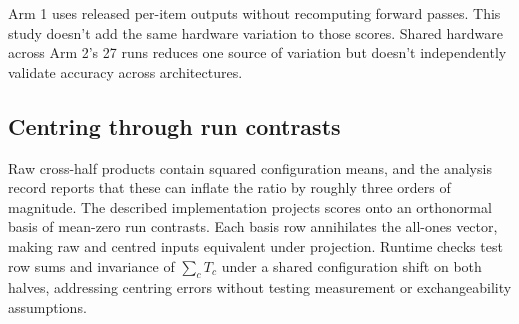 Arm 1 uses released per-item outputs without recomputing forward passes. This study doesn't add the same hardware variation to those scores. Shared hardware across Arm 2's 27 runs reduces one source of variation but doesn't independently validate accuracy across architectures.

\subsection{Centring through run contrasts}
\label{app:centring}
Raw cross-half products contain squared configuration means, and the analysis record reports that these can inflate the ratio by roughly three orders of magnitude. The described implementation projects scores onto an orthonormal basis of mean-zero run contrasts. Each basis row annihilates the all-ones vector, making raw and centred inputs equivalent under projection. Runtime checks test row sums and invariance of $\sum_c T_c$ under a shared configuration shift on both halves, addressing centring errors without testing measurement or exchangeability assumptions.
